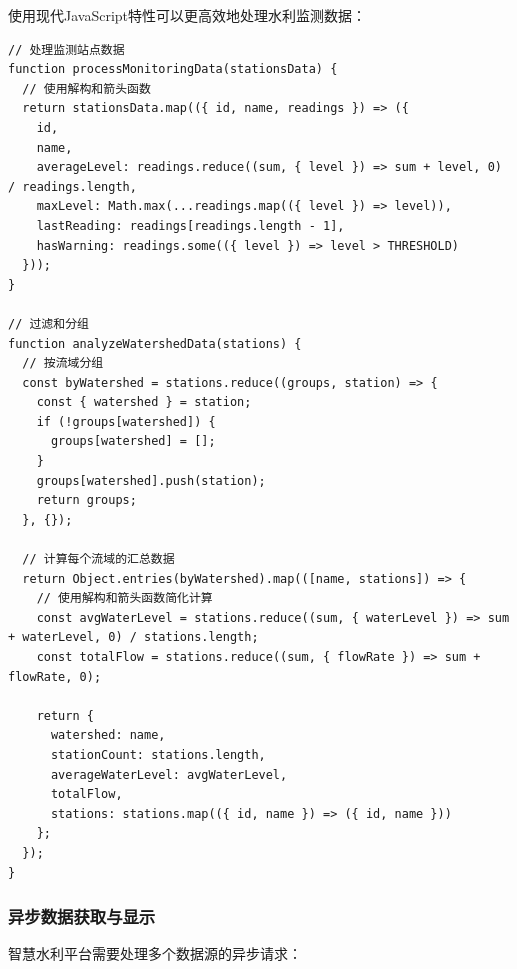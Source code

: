 使用现代JavaScript特性可以更高效地处理水利监测数据：

\begin{lstlisting}
// 处理监测站点数据
function processMonitoringData(stationsData) {
  // 使用解构和箭头函数
  return stationsData.map(({ id, name, readings }) => ({
    id,
    name,
    averageLevel: readings.reduce((sum, { level }) => sum + level, 0) / readings.length,
    maxLevel: Math.max(...readings.map(({ level }) => level)),
    lastReading: readings[readings.length - 1],
    hasWarning: readings.some(({ level }) => level > THRESHOLD)
  }));
}

// 过滤和分组
function analyzeWatershedData(stations) {
  // 按流域分组
  const byWatershed = stations.reduce((groups, station) => {
    const { watershed } = station;
    if (!groups[watershed]) {
      groups[watershed] = [];
    }
    groups[watershed].push(station);
    return groups;
  }, {});
  
  // 计算每个流域的汇总数据
  return Object.entries(byWatershed).map(([name, stations]) => {
    // 使用解构和箭头函数简化计算
    const avgWaterLevel = stations.reduce((sum, { waterLevel }) => sum + waterLevel, 0) / stations.length;
    const totalFlow = stations.reduce((sum, { flowRate }) => sum + flowRate, 0);
    
    return {
      watershed: name,
      stationCount: stations.length,
      averageWaterLevel: avgWaterLevel,
      totalFlow,
      stations: stations.map(({ id, name }) => ({ id, name }))
    };
  });
}
\end{lstlisting}

\subsubsection{异步数据获取与显示}\label{ux5f02ux6b65ux6570ux636eux83b7ux53d6ux4e0eux663eux793a}

智慧水利平台需要处理多个数据源的异步请求：

